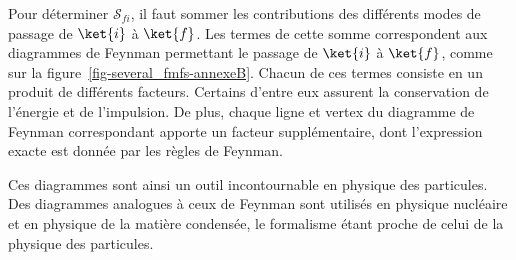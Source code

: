 Pour déterminer $\mathcal{S}_{fi}$, il faut sommer les contributions des différents modes de passage de $\ket{i}$ à $\ket{f}$.
Les termes de cette somme correspondent aux diagrammes de Feynman permettant le passage de $\ket{i}$ à $\ket{f}$, comme sur la figure~\ref{fig-several_fmfs-annexeB}.
Chacun de ces termes consiste en un produit de différents facteurs.
Certains d'entre eux assurent la conservation de l'énergie et de l'impulsion.
De plus, chaque ligne et vertex du diagramme de Feynman correspondant apporte un facteur supplémentaire, dont l'expression exacte est donnée par les règles de Feynman.
\par Ces diagrammes sont ainsi un outil incontournable en physique des particules.
Des diagrammes analogues à ceux de Feynman sont utilisés en physique nucléaire et en physique de la matière condensée, le formalisme étant proche de celui de la physique des particules.